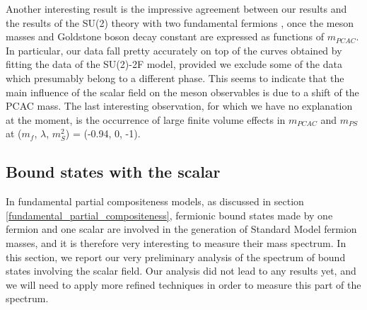 Another interesting result is the impressive agreement between our results and the results  of the SU(2) theory with two fundamental fermions \cite{Arthur:2016dir}, once the meson masses and Goldstone boson decay constant are expressed as functions of $m_{PCAC}$. In particular, our data fall pretty accurately on top of the curves obtained by fitting the data of the SU(2)-2F model, provided we exclude some of the data which presumably belong to a different phase. This seems to indicate that the main influence of the scalar field on the meson observables is due to a shift of the PCAC mass. The last interesting observation, for which we have no explanation at the moment, is the occurrence of large finite volume effects in $m_{PCAC}$ and $m_{PS}$ at ($m_f$, $\lambda$, $m_S^2$) = (-0.94, 0, -1).





\subsection{Bound states with the scalar}

In fundamental partial compositeness models, as discussed in section \ref{fundamental_partial_compositeness}, fermionic bound states made by one fermion and one scalar are involved in the generation of Standard Model fermion masses, and it is therefore very interesting to measure their mass spectrum. In this section, we report our very preliminary analysis of the spectrum of bound states involving the scalar field. Our analysis did not lead to any results yet, and we will need to apply more refined techniques in order to measure this part of the spectrum.  

